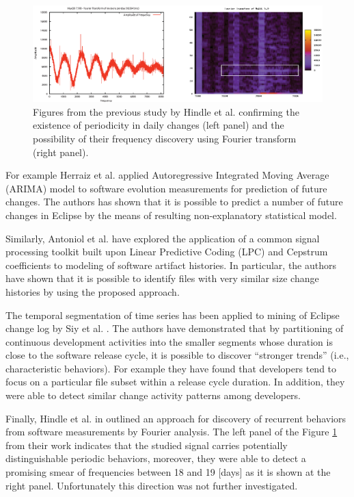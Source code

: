 \begin{figure}[t!]
   \centering
   \includegraphics[width=145mm]{figures/FourrierMySQL.eps}
   \caption[Figures from the previous study by Hindle et al. confirming the existence of periodicity in software development.]
   {Figures from the previous study by Hindle et al. \cite{citeulike:10377345} confirming the existence of periodicity
   in daily changes (left panel) and the possibility of their frequency discovery using Fourier transform (right panel).}
   \label{fig:mysql-fourrier}
\end{figure}

For example Herraiz et al. \cite{citeulike:6544685} applied Autoregressive Integrated Moving Average (ARIMA) model 
to software evolution measurements for prediction of future changes. The authors has shown that it is possible to 
predict a number of future changes in Eclipse by the means of resulting non-explanatory statistical model. 

Similarly, Antoniol et al. \cite{citeulike:3378725} have explored the application of a common signal processing toolkit 
built upon Linear Predictive Coding (LPC) and Cepstrum coefficients to modeling of software artifact histories. 
In particular, the authors have shown that it is possible to identify files with very similar size change histories 
by using the proposed approach.

The temporal segmentation of time series has been applied to mining of Eclipse change log by Siy et al. \cite{citeulike:10896305}.
The authors have demonstrated that by partitioning of continuous development activities into the smaller segments whose duration 
is close to the software release cycle, it is possible to discover ``stronger trends'' (i.e., characteristic behaviors). 
For example they have found that developers tend to focus on a particular file subset within a release cycle duration. 
In addition, they were able to detect similar change activity patterns among developers.

Finally, Hindle et al. in \cite{citeulike:10377345} outlined an approach for discovery of recurrent behaviors from software 
measurements by Fourier analysis. 
The left panel of the Figure \ref{fig:mysql-fourrier} from their work indicates that the studied signal carries potentially 
distinguishable periodic behaviors, moreover, they were able to detect a promising smear of frequencies between 18 and 19 
[days] as it is shown at the right panel. Unfortunately this direction was not further investigated.

